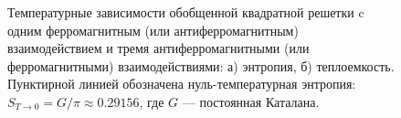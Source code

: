 \documentclass[utf8,12pt]{jetp}
\begin{document}
\begin{figure}[h]
	\begin{minipage}[h]{0.5\linewidth}
	\end{minipage}
	\hfill
	\begin{minipage}[h]{0.5\linewidth}
	\end{minipage}
	\caption{Температурные зависимости обобщенной квадратной решетки c одним ферромагнитным (или антиферромагнитным) взаимодействием и тремя антиферромагнитными (или ферромагнитными) взаимодействиями: а) энтропия, б) теплоемкость. Пунктирной линией обозначена нуль-температурная энтропия: $S_{T\rightarrow 0} = G/\pi\approx 0.29156$, где $G$ --- постоянная Каталана.}
	\label{Catalan}
\end{figure}
\end{document}
